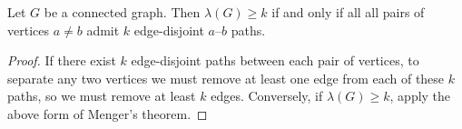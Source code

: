 \begin{theorem}
	Let \( G \) be a connected graph.
	Then \( \lambda(G) \geq k \) if and only if all all pairs of vertices \( a \neq b \) admit \( k \) edge-disjoint \( a \)--\( b \) paths.
\end{theorem}
\begin{proof}
	If there exist \( k \) edge-disjoint paths between each pair of vertices, to separate any two vertices we must remove at least one edge from each of these \( k \) paths, so we must remove at least \( k \) edges.
	Conversely, if \( \lambda(G) \geq k \), apply the above form of Menger's theorem.
\end{proof}
